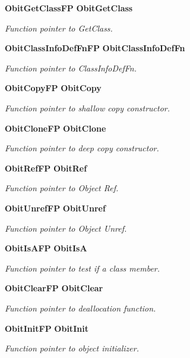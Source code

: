 \begin{CompactItemize}
{\bf Obit\-Get\-Class\-FP} {\bf Obit\-Get\-Class}
\begin{CompactList}\small\item\em Function pointer to Get\-Class. \item\end{CompactList}\item 
{\bf Obit\-Class\-Info\-Def\-Fn\-FP} {\bf Obit\-Class\-Info\-Def\-Fn}
\begin{CompactList}\small\item\em Function pointer to Class\-Info\-Def\-Fn. \item\end{CompactList}\item 
{\bf Obit\-Copy\-FP} {\bf Obit\-Copy}
\begin{CompactList}\small\item\em Function pointer to shallow copy constructor. \item\end{CompactList}\item 
{\bf Obit\-Clone\-FP} {\bf Obit\-Clone}
\begin{CompactList}\small\item\em Function pointer to deep copy constructor. \item\end{CompactList}\item 
{\bf Obit\-Ref\-FP} {\bf Obit\-Ref}
\begin{CompactList}\small\item\em Function pointer to Object Ref. \item\end{CompactList}\item 
{\bf Obit\-Unref\-FP} {\bf Obit\-Unref}
\begin{CompactList}\small\item\em Function pointer to Object Unref. \item\end{CompactList}\item 
{\bf Obit\-Is\-AFP} {\bf Obit\-Is\-A}
\begin{CompactList}\small\item\em Function pointer to test if a class member. \item\end{CompactList}\item 
{\bf Obit\-Clear\-FP} {\bf Obit\-Clear}
\begin{CompactList}\small\item\em Function pointer to deallocation function. \item\end{CompactList}\item 
{\bf Obit\-Init\-FP} {\bf Obit\-Init}
\begin{CompactList}\small\item\em Function pointer to object initializer. \item\end{CompactList}\end{CompactItemize}


